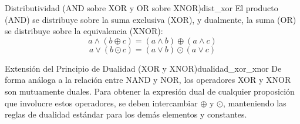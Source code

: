 \begin{teorema}{Distributividad (AND sobre XOR y OR sobre XNOR)}{dist_xor}
El producto (AND) se distribuye sobre la suma exclusiva (XOR), y dualmente, la suma (OR) se distribuye sobre la equivalencia (XNOR):
\[ a \wedge (b \oplus c) = (a \wedge b) \oplus (a \wedge c) \]
\[ a \vee (b \odot c) = (a \vee b) \odot (a \vee c) \]
\end{teorema}

\begin{teorema}{Extensión del Principio de Dualidad (XOR y XNOR)}{dualidad_xor_xnor}
De forma análoga a la relación entre NAND y NOR, los operadores XOR y XNOR son mutuamente duales. Para obtener la expresión dual de cualquier proposición que involucre estos operadores, se deben intercambiar $\oplus$ y $\odot$, manteniendo las reglas de dualidad estándar para los demás elementos y constantes.
\end{teorema}

